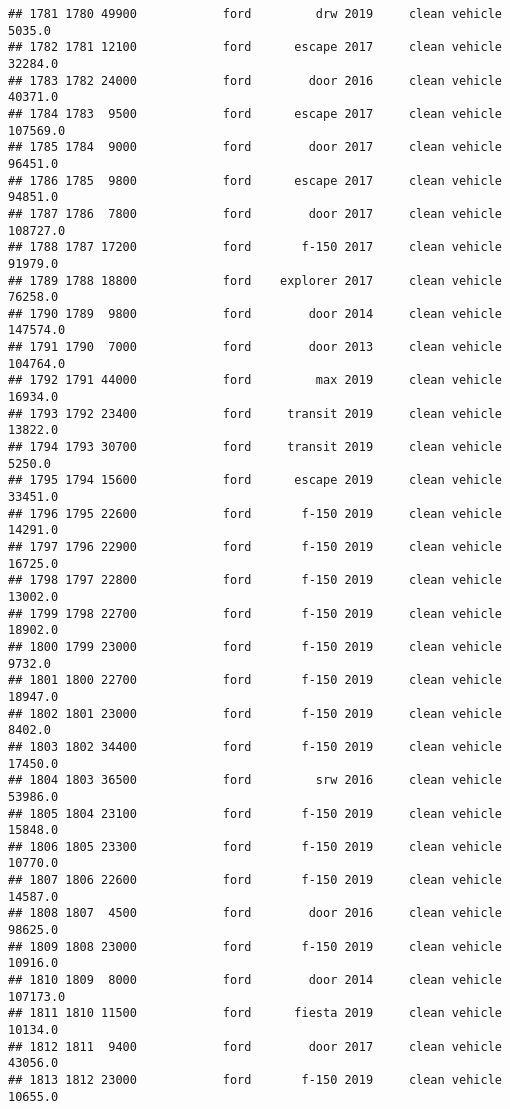 \documentclass[
]{article}
\begin{document}
\begin{verbatim}
## 1781 1780 49900            ford         drw 2019     clean vehicle    5035.0
## 1782 1781 12100            ford      escape 2017     clean vehicle   32284.0
## 1783 1782 24000            ford        door 2016     clean vehicle   40371.0
## 1784 1783  9500            ford      escape 2017     clean vehicle  107569.0
## 1785 1784  9000            ford        door 2017     clean vehicle   96451.0
## 1786 1785  9800            ford      escape 2017     clean vehicle   94851.0
## 1787 1786  7800            ford        door 2017     clean vehicle  108727.0
## 1788 1787 17200            ford       f-150 2017     clean vehicle   91979.0
## 1789 1788 18800            ford    explorer 2017     clean vehicle   76258.0
## 1790 1789  9800            ford        door 2014     clean vehicle  147574.0
## 1791 1790  7000            ford        door 2013     clean vehicle  104764.0
## 1792 1791 44000            ford         max 2019     clean vehicle   16934.0
## 1793 1792 23400            ford     transit 2019     clean vehicle   13822.0
## 1794 1793 30700            ford     transit 2019     clean vehicle    5250.0
## 1795 1794 15600            ford      escape 2019     clean vehicle   33451.0
## 1796 1795 22600            ford       f-150 2019     clean vehicle   14291.0
## 1797 1796 22900            ford       f-150 2019     clean vehicle   16725.0
## 1798 1797 22800            ford       f-150 2019     clean vehicle   13002.0
## 1799 1798 22700            ford       f-150 2019     clean vehicle   18902.0
## 1800 1799 23000            ford       f-150 2019     clean vehicle    9732.0
## 1801 1800 22700            ford       f-150 2019     clean vehicle   18947.0
## 1802 1801 23000            ford       f-150 2019     clean vehicle    8402.0
## 1803 1802 34400            ford       f-150 2019     clean vehicle   17450.0
## 1804 1803 36500            ford         srw 2016     clean vehicle   53986.0
## 1805 1804 23100            ford       f-150 2019     clean vehicle   15848.0
## 1806 1805 23300            ford       f-150 2019     clean vehicle   10770.0
## 1807 1806 22600            ford       f-150 2019     clean vehicle   14587.0
## 1808 1807  4500            ford        door 2016     clean vehicle   98625.0
## 1809 1808 23000            ford       f-150 2019     clean vehicle   10916.0
## 1810 1809  8000            ford        door 2014     clean vehicle  107173.0
## 1811 1810 11500            ford      fiesta 2019     clean vehicle   10134.0
## 1812 1811  9400            ford        door 2017     clean vehicle   43056.0
## 1813 1812 23000            ford       f-150 2019     clean vehicle   10655.0

\end{verbatim}
\end{document}
